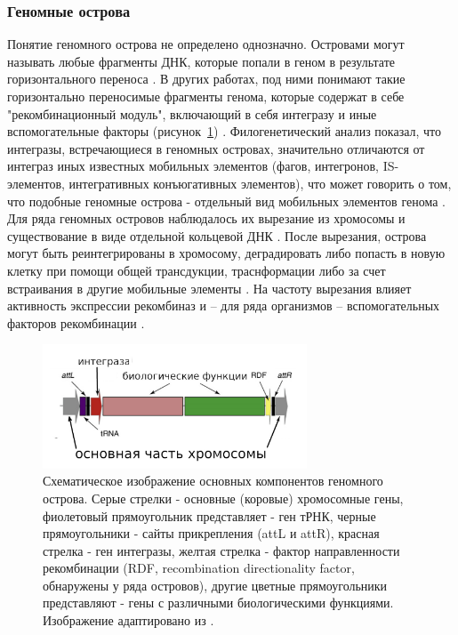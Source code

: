 


\subsubsection{Геномные острова}
Понятие геномного острова не определено однозначно. Островами могут называть любые фрагменты ДНК, которые попали в геном в результате горизонтального переноса \cite{langille2010detecting, bazin2020panrgp}. В других работах, под ними понимают такие горизонтально переносимые фрагменты генома, которые содержат в себе "рекомбинационный модуль", включающий в себя интегразу и иные вспомогательные факторы (рисунок~\ref{img:gi}) \cite{boyd2009genomic}. Филогенетический анализ показал, что интегразы, встречающиеся в геномных островах, значительно отличаются от интеграз иных известных мобильных элементов (фагов, интегронов, IS-элементов, интегративных конъюгативных элементов), что может говорить о том, что подобные геномные острова - отдельный вид мобильных элементов генома \cite{boyd2009genomic}. Для ряда геномных островов наблюдалось их вырезание из хромосомы и существование в виде отдельной кольцевой ДНК \cite{blum1994excision, rajanna2003vibrio}. После вырезания, острова могут быть реинтегрированы в хромосому, деградировать либо попасть в новую клетку при помощи общей трансдукции, траснформации либо за счет встраивания в другие мобильные элементы \cite{carpenter2016pathogenicity, pant2020molecular, boyd2009genomic}. На частоту вырезания влияет активность экспрессии рекомбиназ и -- для ряда организмов -- вспомогательных факторов рекомбинации \cite{pant2020molecular}.

\begin{figure}[!ht] 
  \center
  \includegraphics [width=0.7\textwidth] {Dissertation/images/lit/gi.jpg}
  \caption{Схематическое изображение основных компонентов геномного острова. Серые стрелки - основные (коровые) хромосомные гены, фиолетовый прямоугольник представляет - ген тРНК, черные прямоугольники - сайты прикрепления (attL и attR), красная стрелка - ген интегразы, желтая стрелка - фактор направленности рекомбинации (RDF, recombination directionality factor, обнаружены у ряда островов), другие цветные прямоугольники представляют - гены с различными биологическими функциями. Изображение адаптировано из \cite{boyd2009genomic}.} 
  \label{img:gi}  
\end{figure}

